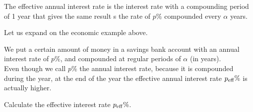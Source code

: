 \begin{annotation}
\begin{goals}
	The effective annual interest rate is the interest rate with a compounding period of 1 year that gives the same result s the rate of $p\%$ compounded every $\alpha$ years.
\end{goals}
\end{annotation}
\question \label{de:economic}
	Let us expand on the economic example above.
	
	We put a certain amount of money in a savings bank account with an annual interest rate of $p\%$, and compounded at regular periods of $\alpha$ (in years). \\
	
	Even though we call $p\%$ the annual interest rate, because it is compounded during the year, at the end of the year the effective annual interest rate $p_{\rm eff}\%$ is actually higher.
	
	Calculate the effective interest rate $p_{\rm eff}\%$.


	

\bookonlynewpage



